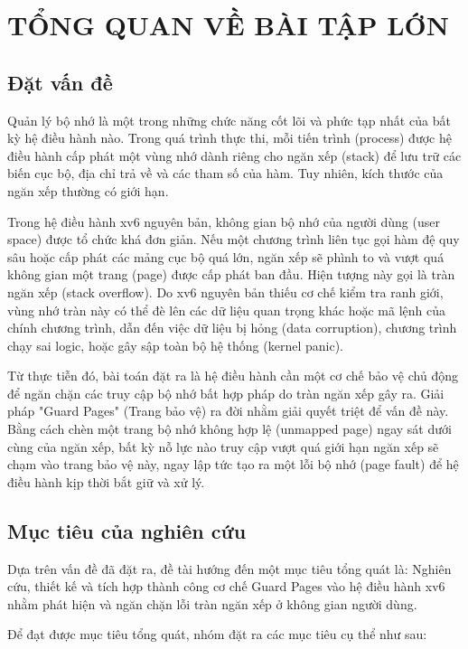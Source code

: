 \chapter{TỔNG QUAN VỀ BÀI TẬP LỚN}
\section{Đặt vấn đề}

Quản lý bộ nhớ là một trong những chức năng cốt lõi và phức tạp nhất của bất kỳ hệ điều hành nào. Trong quá trình thực thi, mỗi tiến trình (process) được hệ điều hành cấp phát một vùng nhớ dành riêng cho ngăn xếp (stack) để lưu trữ các biến cục bộ, địa chỉ trả về và các tham số của hàm. Tuy nhiên, kích thước của ngăn xếp thường có giới hạn.

Trong hệ điều hành xv6 nguyên bản, không gian bộ nhớ của người dùng (user space) được tổ chức khá đơn giản. Nếu một chương trình liên tục gọi hàm đệ quy sâu hoặc cấp phát các mảng cục bộ quá lớn, ngăn xếp sẽ phình to và vượt quá không gian một trang (page) được cấp phát ban đầu. Hiện tượng này gọi là tràn ngăn xếp (stack overflow). Do xv6 nguyên bản thiếu cơ chế kiểm tra ranh giới, vùng nhớ tràn này có thể đè lên các dữ liệu quan trọng khác hoặc mã lệnh của chính chương trình, dẫn đến việc dữ liệu bị hỏng (data corruption), chương trình chạy sai logic, hoặc gây sập toàn bộ hệ thống (kernel panic).

Từ thực tiễn đó, bài toán đặt ra là hệ điều hành cần một cơ chế bảo vệ chủ động để ngăn chặn các truy cập bộ nhớ bất hợp pháp do tràn ngăn xếp gây ra. Giải pháp "Guard Pages" (Trang bảo vệ) ra đời nhằm giải quyết triệt để vấn đề này. Bằng cách chèn một trang bộ nhớ không hợp lệ (unmapped page) ngay sát dưới cùng của ngăn xếp, bất kỳ nỗ lực nào truy cập vượt quá giới hạn ngăn xếp sẽ chạm vào trang bảo vệ này, ngay lập tức tạo ra một lỗi bộ nhớ (page fault) để hệ điều hành kịp thời bắt giữ và xử lý.

\section{Mục tiêu của nghiên cứu}
Dựa trên vấn đề đã đặt ra, đề tài hướng đến một mục tiêu tổng quát là: Nghiên cứu, thiết kế và tích hợp thành công cơ chế Guard Pages vào hệ điều hành xv6 nhằm phát hiện và ngăn chặn lỗi tràn ngăn xếp ở không gian người dùng.

Để đạt được mục tiêu tổng quát, nhóm đặt ra các mục tiêu cụ thể như sau:

